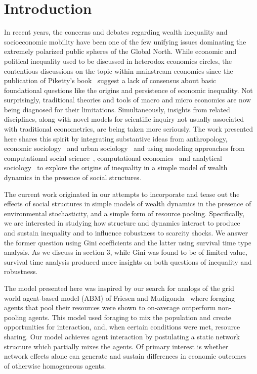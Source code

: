 \section{Introduction}
In recent years, the concerns and debates regarding wealth inequality and socioeconomic mobility have been one of the few unifying issues dominating the extremely polarized public spheres of the Global North. While economic and political inequality used to be discussed in heterodox economics circles, the contentious discussions on the topic within mainstream economics since the publication of Piketty's book~\cite{piketty2017capital} suggest a lack of consensus about basic foundational questions like the origins and persistence of economic inequality. Not surprisingly, traditional theories and tools of macro and micro economics are now being diagnosed for their limitations. Simultaneously, insights from related disciplines, along with novel models for scientific inquiry not usually associated with traditional econometrics, are being taken more seriously. The work presented here shares this spirit by integrating substantive ideas from anthropology, economic sociology~\cite{granovetter2017society} and urban sociology~\cite{sampson2012great} and using modeling approaches from computational social science~\cite{hedstrom2018}, computational economics~\cite{tesfatsion} and analytical sociology~\cite{hedstrom2011oxford} to explore the origins of inequality in a simple model of wealth dynamics in the presence of social structures.    

The current work originated in our attempts to incorporate and tease out the effects of social structures in simple models of wealth dynamics in the presence of environmental stochasticity, and a simple form of resource pooling. Specifically, we are interested in studying how structure and dynamics interact to produce and sustain inequality and to influence robustness to scarcity shocks. We answer the former question using Gini coefficients and the latter using survival time type analysis. As we discuss in section 3, while Gini was found to be of limited value, survival time analysis produced more insights on both questions of inequality and robustness. 

The model presented here was inspired by our search for analogs of the grid world agent-based model (ABM) of Friesen and Mudigonda~\cite{srimil} where foraging agents that pool their resources were shown to on-average outperform non-pooling agents. This model used foraging to mix the population and create opportunities for interaction, and, when certain conditions were met, resource sharing. Our model achieves agent interaction by postulating a static network structure which partially mixes the agents. Of primary interest is whether network effects alone can generate and sustain differences in economic outcomes of otherwise homogeneous agents.  

